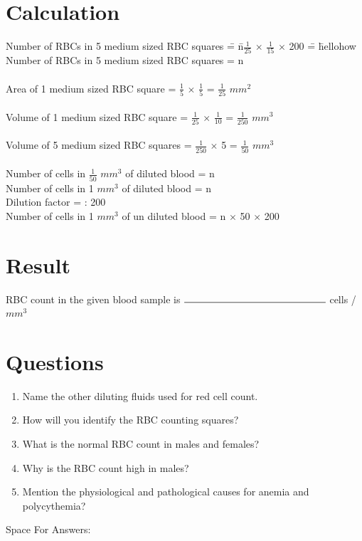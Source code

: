 \documentclass[a4paper,12pt,openany,twoside]{book}
\newcommand{\blankpageForAnswers}{
	\newpage
	\thispagestyle{plain}
	\begin{center}
		\Large Space For Answers: 
	\end{center}
	}
\begin{document}
					\section*{Calculation}
					\begin{tabbing}
					Number of RBCs in 5 medium sized RBC squares \= = \= n$\frac{1}{25}$ $\times$ $\frac{1}{15}$ $\times$ 200 \= = \= hellohow \kill\\
					
					Number of RBCs in 5 medium sized RBC squares \> = \> n\vspace{.4cm}  \\
					\> \\
					Area of 1 medium  sized RBC square \> = \>$\frac{1}{5}$ $\times$ $\frac{1}{5}$ \> = \> $\frac{1}{25}$ $mm^2$\newline\vspace{.4cm}\\
					\> \\
					Volume of 1 medium sized RBC square \> = \> $\frac{1}{25}$ $\times$ $\frac{1}{10}$\> =  \> $\frac{1}{250}$ $mm^3$\\
					\> \\
					Volume of 5 medium sized RBC squares \> = \> $\frac{1}{250}$ $\times$ 5 \> 			= \> $\frac{1}{50}$ $mm^3$\\
					\> \\
					Number of cells in  $\frac{1}{50}$ $mm^3$ of diluted blood  \> = \> n\\
					Number of cells in  1 $mm^3$  of diluted blood \> = \> 50 n\\
					Dilution factor \> =  : 200\newline\vspace{.4cm}\\
					Number of cells in 1 $mm^3$ of un diluted blood 	\> = \> n $\times$ 50 $\times$ 200 \\
					\end{tabbing}

					\section*{Result}
					RBC  count in the given  blood sample is $\rule{5cm}{0.5pt}$ cells / $mm^3$
					\section*{Questions}
					\begin{enumerate}

						\item {Name the other diluting fluids used for red  cell count.}
						\item{How will you identify the RBC counting squares?}
						\item{What is the normal RBC count in males and females?}
						\item{Why is the RBC count high in males?}
						\item{Mention the physiological and pathological causes for anemia and polycythemia?}


					\end{enumerate}
					\blankpageForAnswers
\end{document}
